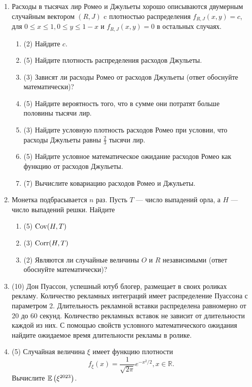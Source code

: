 \begin{enumerate}
	\item Расходы в тысячах лир Ромео и Джульеты хорошо описываются двумерным случайным вектором $(R,J)$ c плотностью распределения
	$f_{R, J}(x, y)=c$, для  $0 \leq x \leq 1,0 \leq y \leq 1-x$ и $ f_{R, J}(x, y)=0$ в остальных случаях. 
	\begin{enumerate}
	\item (2) Найдите $c$.
	\item (5) Найдите плотность распределения расходов Джульеты.
	\item (3) Зависят ли расходы Ромео от расходов Джульеты (ответ обоснуйте математически)?
	\item (5) Найдите вероятность того, что в сумме они потратят больше половины тысячи лир.
	\item (3) Найдите условную плотность расходов Ромео при условии, что расходы Джульеты равны $\frac{2}{3}$ тысячи лир.
	\item (5) Найдите условное математическое ожидание расходов Ромео как функцию от расходов Джульеты.
	\item (7) Вычислите ковариацию расходов Ромео и Джульеты.
	\end{enumerate}
	
	\item Монетка подбрасывается $n$ раз. 
	Пусть $T$ — число выпадений орла, а $H$ — число выпадений решки. Найдите 
	\begin{enumerate}
	\item (5) $\operatorname{Cov}(H, T)$
	\item (3) $\operatorname{Corr}(H, T)$
	\item (2) Являются ли случайные величины $O$ и $R$ независимыми (ответ обоснуйте математически)?  
	\end{enumerate}
	
	
	\item (10) Дон Пуассон, успешный ютуб блогер, размещает в своих роликах рекламу. 
	Количество рекламных интеграций имеет распределение Пуассона с параметром 2. 
	Длительность рекламной вставки распределена равномерно от 20 до 60 секунд. 
	Количество рекламных вставок не зависит от длительности каждой из них. 
	С помощью свойств условного математического ожидания найдите ожидаемое время длительности рекламы в ролике.
	
	
	\item (5) Случайная величина $\xi$ имеет функцию плотности
	\[
	f_{\xi}(x)=\frac{1}{\sqrt{2 \pi}} e^{-x^2 / 2}, x \in \mathbb{R}.
	\]
	Вычислите $\operatorname{\mathbb{E}}\left(\xi^{2023}\right)$.
	

\end{enumerate}
